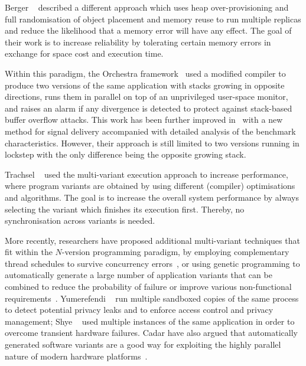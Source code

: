 Berger \etal~\cite{diehard06} described a different approach which uses heap
over-provisioning and full randomisation of object placement and memory reuse
to run multiple replicas and reduce the likelihood that a memory error will
have any effect. The goal of their work is to increase reliability by
tolerating certain memory errors in exchange for space cost and execution time.


Within this paradigm, the Orchestra framework~\cite{orchestra09} used a
modified compiler to produce two versions of the same application with stacks
growing in opposite directions, runs them in parallel on top of an unprivileged
user-space monitor, and raises an alarm if any divergence is detected to
protect against stack-based buffer overflow attacks.  This work has been
further improved in~\cite{orchestra11} with a new method for signal delivery
accompanied with detailed analysis of the benchmark characteristics. However,
their approach is still limited to two versions running in lockstep with the
only difference being the opposite growing stack.

Trachsel \etal~\cite{trachsel10} used the multi-variant execution approach to
increase performance, where program variants are obtained by using different
(compiler) optimisations and algorithms.  The goal is to increase the overall
system performance by always selecting the variant which finishes its execution
first. Thereby, no synchronisation across variants is needed.

More recently, researchers have proposed additional multi-variant techniques
that fit within the $N$-version programming paradigm, \eg by employing
complementary thread schedules to survive concurrency
errors~\cite{compl-schedules11}, or using genetic programming to automatically
generate a large number of application variants that can be combined to reduce
the probability of failure or improve various non-functional
requirements~\cite{gismoe}. Yumerefendi \etal~\cite{tightlip} run multiple
sandboxed copies of the same process to detect potential privacy leaks and to
enforce access control and privacy management; Shye \etal~\cite{shye2009} used
multiple instances of the same application in order to overcome transient
hardware failures. Cadar \etal have also argued that automatically generated
software variants are a good way for exploiting the highly parallel nature of
modern hardware platforms~\cite{multiplicity}.

